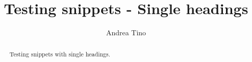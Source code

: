\documentclass{article}
\begin{document}
\title{Testing snippets - Single headings}
\author{Andrea Tino}

\maketitle

\begin{abstract}
Testing snippets with single headings.
\end{abstract}




\end{document}
